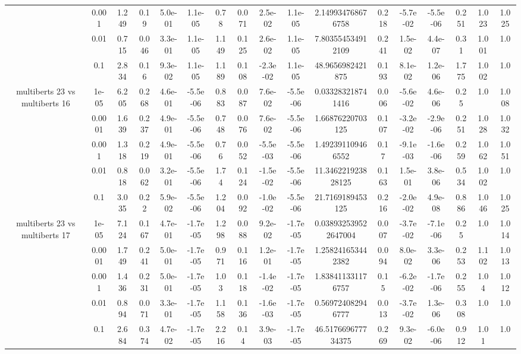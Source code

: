 \begin{tabular}{|c|c|c|c|c|c|c|c|c|c|c|c|c|c|c|c|c|}
 & 0.001 & 1.249 & 0.19 & 5.0e-01 & 1.1e-05 & 0.78 & 0.071 & 2.5e-02 & 1.1e-05 & 2.149934768676758 & 0.218 & -5.7e-02 & -5.5e-06 & 0.251 & 1.023 & 1.025 \\
 & 0.01 & 0.715 & 0.046 & 3.3e-01 & 1.1e-05 & 1.149 & 0.125 & 2.6e-02 & 1.1e-05 & 7.803554534912109 & 0.241 & 1.5e-02 & 4.4e-07 & 0.31 & 1.001 & 1.0 \\
 & 0.1 & 2.834 & 0.16 & 9.3e-02 & 1.1e-05 & 1.189 & 0.108 & -2.3e-02 & 1.1e-05 & 48.9656982421875 & 0.193 & 8.1e-02 & 1.2e-06 & 1.775 & 1.002 & 1.0 \\
\hline
\multirow{5}{*}{multiberts 23 vs multiberts 16} & 1e-05 & 6.205 & 0.268 & 4.6e-01 & -5.5e-06 & 0.883 & 0.087 & 7.6e-02 & -5.5e-06 & 0.033283218741416 & 0.006 & -5.6e-02 & 4.6e-06 & 0.25 & 1.0 & 1.008 \\
 & 0.0001 & 1.639 & 0.237 & 4.9e-01 & -5.5e-06 & 0.748 & 0.076 & 7.6e-02 & -5.5e-06 & 1.66876220703125 & 0.107 & -3.2e-02 & -2.9e-06 & 0.251 & 1.028 & 1.032 \\
 & 0.001 & 1.318 & 0.219 & 4.9e-01 & -5.5e-06 & 0.76 & 0.052 & -5.5e-03 & -5.5e-06 & 1.492391109466552 & 0.17 & -9.1e-03 & -1.6e-06 & 0.259 & 1.062 & 1.051 \\
 & 0.01 & 0.818 & 0.062 & 3.2e-01 & -5.5e-06 & 1.74 & 0.124 & -1.5e-02 & -5.5e-06 & 11.346221923828125 & 0.163 & 1.5e-01 & 3.8e-06 & 0.534 & 1.002 & 1.0 \\
 & 0.1 & 3.035 & 0.22 & 5.9e-02 & -5.5e-06 & 1.204 & 0.092 & -1.0e-02 & -5.5e-06 & 21.7169189453125 & 0.216 & -2.0e-02 & 4.9e-08 & 0.886 & 1.046 & 1.025 \\
\hline
\multirow{5}{*}{multiberts 23 vs multiberts 17} & 1e-05 & 7.124 & 0.167 & 4.7e-01 & -1.7e-05 & 1.298 & 0.088 & 9.2e-02 & -1.7e-05 & 0.038932539522647004 & 0.007 & -3.7e-02 & -7.1e-06 & 0.25 & 1.0 & 1.014 \\
 & 0.0001 & 1.749 & 0.241 & 5.0e-01 & -1.7e-05 & 0.971 & 0.116 & 1.2e-01 & -1.7e-05 & 1.258241653442382 & 0.094 & 8.0e-02 & 3.3e-06 & 0.253 & 1.102 & 1.013 \\
 & 0.001 & 1.436 & 0.231 & 5.0e-01 & -1.7e-05 & 1.03 & 0.118 & -1.4e-02 & -1.7e-05 & 1.838411331176757 & 0.15 & -6.2e-02 & -1.7e-06 & 0.255 & 1.04 & 1.012 \\
 & 0.01 & 0.894 & 0.071 & 3.3e-01 & -1.7e-05 & 1.158 & 0.136 & -1.6e-03 & -1.7e-05 & 0.569724082946777 & 0.013 & -3.7e-02 & 1.3e-06 & 0.308 & 1.0 & 1.0 \\
 & 0.1 & 2.684 & 0.374 & 4.7e-02 & -1.7e-05 & 2.216 & 0.14 & 3.9e-03 & -1.7e-05 & 46.517669677734375 & 0.269 & 9.3e-02 & -6.0e-06 & 0.912 & 1.01 & 1.0 \\

\end{tabular}
